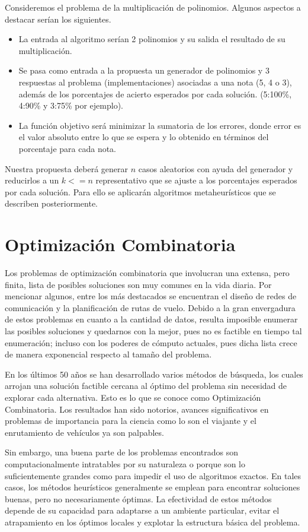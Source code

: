 \documentclass[a4paper,12pt]{book}
\begin{document}
		Consideremos el problema de la multiplicación de polinomios. Algunos aspectos a destacar serían los siguientes.
		\begin{itemize}
			\item La entrada al algoritmo serían 2 polinomios y su salida el resultado de su multiplicación.
			\item Se pasa como entrada a la propuesta un generador de polinomios y 3 respuestas al problema (implementaciones) asociadas a una nota (5, 4 o 3), además de los porcentajes de acierto esperados por cada solución. (5:100\%, 4:90\% y 3:75\% por ejemplo).
			\item La función objetivo será minimizar la sumatoria de los errores, donde error es el valor absoluto entre lo que se espera y lo obtenido en términos del porcentaje para cada nota.
		\end{itemize}
	
		Nuestra propuesta deberá generar $n$ casos aleatorios con ayuda del generador y reducirlos a un $k <= n$ representativo que se ajuste a los porcentajes esperados por cada solución. Para ello se aplicarán algoritmos metaheurísticos que se describen posteriormente.

\chapter{Optimización Combinatoria}
	Los problemas de optimización combinatoria que involucran una extensa, pero finita, lista de posibles soluciones son muy comunes en la vida diaria. Por mencionar algunos, entre los más destacados se encuentran el diseño de redes de comunicación y la planificación de rutas de vuelo. Debido a la gran envergadura de estos problemas en cuanto a la cantidad de datos, resulta imposible enumerar las posibles soluciones y quedarnos con la mejor, pues no es factible en tiempo tal enumeración; incluso con los poderes de cómputo actuales, pues dicha lista crece de manera exponencial respecto al tamaño del problema.
	
	En los últimos 50 años se han desarrollado varios métodos de búsqueda, los cuales arrojan una solución factible cercana al óptimo del problema sin necesidad de explorar cada alternativa. Esto es lo que se conoce como Optimización Combinatoria. Los resultados han sido notorios, avances significativos en problemas de importancia para la ciencia como lo son el viajante y el enrutamiento de vehículos ya son palpables.
	
	Sin embargo, una buena parte de los problemas encontrados son computacionalmente intratables por su naturaleza o porque son lo suficientemente grandes como para impedir el uso de algoritmos exactos. En tales casos, los métodos heurísticos generalmente se emplean para encontrar soluciones buenas, pero no necesariamente óptimas. La efectividad de estos métodos depende de su capacidad para adaptarse a un ambiente particular, evitar el atrapamiento en los óptimos locales y explotar la estructura básica del problema.
	
\end{document}
